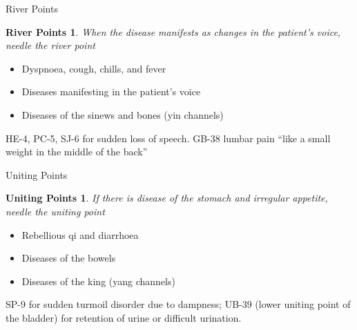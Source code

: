 \begin{frame}{River Points}
\newtheorem{river}{River Points}
\begin{river}
When the disease manifests as changes in the patient's voice, needle the river point
\end{river}

\begin{itemize}
\item Dyspnoea, cough, chills, and fever
\item Diseases manifesting in the patient's voice
\item Diseases of the sinews and bones (yin channels) 
\end{itemize}

\vspace{0.5em}

HE-4, PC-5, SJ-6 for sudden loss of speech. GB-38 lumbar pain ``like a small weight in the middle of the back'' 

\end{frame}

\begin{frame}{Uniting Points}
\newtheorem{unite}{Uniting Points}
\begin{unite}
If there is disease of the stomach and irregular appetite, needle the uniting point
\end{unite}

\begin{itemize}
\item Rebellious qi and diarrhoea
\item Diseases of the bowels
\item Diseases of the king (yang channels) 
\end{itemize}

\vspace{0.5em}

SP-9 for sudden turmoil disorder due to dampness; UB-39 (lower uniting point of the bladder) for retention of urine or difficult urination. 
\end{frame}

